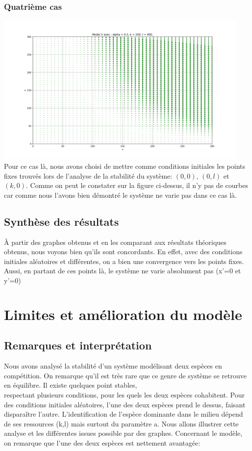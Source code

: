 \documentclass{article}
\begin{document}
\subsubsection{Quatrième cas}
\includegraphics[width = 12.5cm]{../img/figure_pf.png}\\
Pour ce cas là, nous avons choisi de mettre comme conditions initiales les points fixes trouvés lors de l'analyse de la stabilité du système: $(0,0)$, $(0,l)$ et $(k,0)$. Comme on peut le constater sur la figure ci-dessus, il n'y pas de courbes car comme nous l'avons bien démontré le système ne varie pas dans ce cas là.

\setcounter{secnumdepth}{1}
\subsection{Synthèse des résultats}
À partir des graphes obtenus et en les comparant aux résultats théoriques obtenus, nous voyons bien qu'ils sont concordants. En effet, avec des conditions initiales aléatoires et différentes, on a bien une convergence vers les points fixes. Aussi, en partant de ces points là, le système ne varie absolument pas (x'=0 et y'=0)\\

\section{Limites et amélioration du modèle}
\subsection{Remarques et interprétation}
Nous avons analysé la stabilité d'un système modélisant deux espèces en compétition. On remarque qu'il est très rare que ce genre de système se retrouve en équilibre. Il existe quelques point stables,\\respectant plusieurs conditions, pour les quels les deux espèces cohabitent. Pour des conditions initiales aléatoires, l'une des deux espèces prend le dessus, faisant disparaître l'autre. L'identification de l'espèce dominante dans le milieu dépend de ses ressources (k,l) mais surtout du paramètre a. Nous allons illustrer cette analyse et les différentes issues possible par des graphes. Concernant le modèle, on remarque que l'une des deux espèces est nettement avantagée: 
\end{document}
